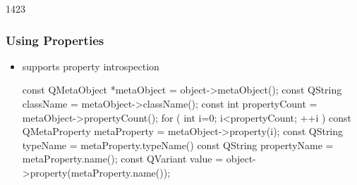 \begin{slide}[fragile]{1423}
\frametitle{Using Properties}
\begin{itemize}
\item {} supports property introspection\smallskip
  \begin{cpp}
  const QMetaObject *metaObject = object->metaObject();
  const QString className = metaObject->className();
  const int propertyCount = metaObject->propertyCount();
  for ( int i=0; i<propertyCount; ++i ) {
    const QMetaProperty metaProperty = metaObject->property(i);
    const QString typeName = metaProperty.typeName()
    const QString propertyName = metaProperty.name();
    const QVariant value = object->property(metaProperty.name());
  }
  \end{cpp}
\end{itemize}
\end{slide}
